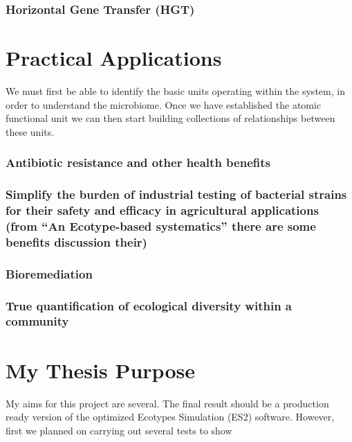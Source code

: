 \subsubsection*{Horizontal Gene Transfer (HGT)}

\section{Practical Applications}
We must first be able to identify the basic units operating within the system, in order to understand the microbiome.
Once we have established the atomic functional unit we can then start building collections of relationships between these units. 

\subsubsection*{Antibiotic resistance and other health benefits}
\subsubsection*{Simplify the burden of industrial testing of bacterial strains for their safety and efficacy in agricultural applications (from ``An Ecotype-based systematics'' there are some benefits discussion their)}
\subsubsection*{Bioremediation}
\subsubsection*{True quantification of ecological diversity within a community}


\section{My Thesis Purpose}%

My aims for this project are several.
The final result should be a production ready version of the optimized Ecotypes Simulation (ES2) software.
However, first we planned on carrying out several tests to show 


